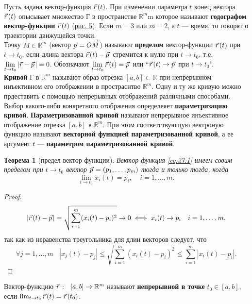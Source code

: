 \documentclass[12pt]{report}
\numberwithin{equation}{section}
\newtheorem{theorem}{Теорема}[section]
\newcommand{\pvec}[1]{\vec{#1}\mkern2mu\vphantom{#1}}
\begin{document}
Пусть задана вектор-функция $\pvec{r}(t)$. При изменении параметра $t$ конец вектора $\pvec{r}(t)$ опысывает множество Г в пространстве $\mathbb{R}^m$m которое называют \textbf{годографом вектор-функции} $\pvec{r}(t)$ (\hyperref[pic:27:1]{рис. 5}). Если $m = 3$ или $m = 2$, а $t$ --- время, то говорят о траектории движущейся точки.\\

Точку $M \in \mathbb{R}^m$ (вектор $\pvec{p} = \overrightarrow{OM}$) называют \textbf{пределом} вектор-функции $\pvec{r}(t)$ при $t \to t_0$, если длина вектора $\pvec{r}(t) - \pvec{p}$ стремится к нулю при $t \to t_0$, т.е. $\lim\limits_{t \to t_0} |\vec{r} - \pvec{p}| = 0$. Обозначают $\lim\limits_{t \to t_0}\pvec{r}(t) = \pvec{p}$ или ``$\pvec{r}(t) \to \pvec{p}$ при $t \to t_0$''.\\


\textbf{Кривой} Г в $\mathbb{R}^m$ называют образ отрезка $[a,b] \subset \mathbb{R}$ при непрерывном инъективном его отображении в простраснтво $\mathbb{R}^m$. Одну и ту же кривую можно прдеставить с помощью непрерывных отображений различными способами. Выбор какого-либо конкретного отобржения определеяет \textbf{параметризацию кривой}. \textbf{Параметризованной кривой} называют непрерывное инъективное отображение отрезка $[a,b]$ в $\mathbb{R}^m$. При этом соответствующую вектроную функцию называют \textbf{векторной функцией параметризованной кривой}, а ее аргумент $t$ --- \textbf{параметром параметризованной кривой}.

\begin{theorem}[предел вектор-функции] \label{th:27:1}
Вектор-функция \eqref{eq:27:1} имеем совим пределом при $t \to t_0$ вектор $\pvec{p} = (p_1, \ldots, p_m)$ тогда и только тогда, когда
\[ \lim_{t \to t_0} x_i(t) = p_i,~~~~~ i = 1,\ldots, m.\]
\end{theorem}

\begin{proof}
\[ |\pvec{r}(t) - \pvec{p}| = \sqrt{\sum_{i=1}^{m} (x_i(t) - p_i)^2} \to 0 \iff x_i(t) \to p_i~~~ i = 1, \ldots, m,\]
так как из неравенства треугольника для длин векторов следует, что
\[ \forall j = 1, \ldots, m~~~~ |x_j(t) - p_j| \leqslant \sqrt{\sum_{i=1}^m (x_i(t) - p_i)^2} \leqslant \sum_{i=1}^m |x_i(t) - p_i|.\]
\end{proof}

Вектор-функцию $\pvec{r}: ~~ [a,b] \to \mathbb{R}^m$ называют \textbf{непрерывной в точке} $t_0 \in [a,b]$, если $\lim_{t \to t_0}\pvec{r}(t) = \pvec{r}(t_0)$.
\end{document}
